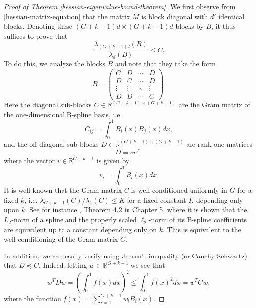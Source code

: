 \documentclass[12pt]{caltech_thesis}
\numberwithin{equation}{section}
\begin{document}
\begin{proof}[Proof of Theorem \ref{hessian-eigenvalue-bound-theorem}]
    We first observe from \eqref{hessian-matrix-equation} that the matrix $M$ is block diagonal with $d'$ identical blocks. Denoting these $(G+k-1)d\times (G+k-1)d$ blocks by $B$, it thus suffices to prove that
    \begin{equation}
        \frac{\lambda_{(G+k-1)d}(B)}{\lambda_{d}(B)} \leq C.
    \end{equation}
    To do this, we analyze the blocks $B$ and note that they take the form
    \begin{equation}
        B = \begin{pmatrix}
            C & D & \cdots & D\\
            D & C & \cdots & D\\
            \vdots & \vdots & \ddots & \vdots\\
            D & D & \cdots & C
        \end{pmatrix}.
    \end{equation}
    Here the diagonal sub-blocks $C\in \mathbb{R}^{(G+k-1)\times (G+k-1)}$ are the Gram matrix of the one-dimensional B-spline basis, i.e.
    \begin{equation}
        C_{ij} = \int_0^1 B_i(x)B_j(x)dx,
    \end{equation}
    and the off-diagonal sub-blocks $D\in \mathbb{R}^{(G+k-1)\times (G+k-1)}$ are rank one matrices
    \begin{equation}
        D = vv^T,
    \end{equation}
    where the vector $v\in \mathbb{R}^{G+k-1}$ is given by
    \begin{equation}
        v_{i} = \int_0^1 B_i(x)dx.
    \end{equation}
    It is well-known that the Gram matrix $C$ is well-conditioned uniformly in $G$ for a fixed $k$, i.e. $\lambda_{G+k-1}(C)/\lambda_1(C) \leq K$ for a fixed constant $K$ depending only upon $k$. See for instance \cite{devore1993constructive}, Theorem 4.2 in Chapter 5, where it is shown that the $L_2$-norm of a spline and the properly scaled $\ell_2$-norm of its B-spline coefficients are equivalent up to a constant depending only on $k$. This is equivalent to the well-conditioning of the Gram matrix $C$.
    
    In addition, we can easily verify using Jensen's inequality (or Cauchy-Schwartz) that $D \preceq C$. Indeed, letting $w\in \mathbb{R}^{G+k-1}$ we see that
    \begin{equation}
        w^TDw = \left(\int_0^1 f(x)dx\right)^2 \leq \int_0^1 f(x)^2dx = w^TCw,
    \end{equation}
    where the function $f(x) = \sum_{i=1}^{G+k-1} w_iB_i(x)$.
    

\end{proof}
\end{document}
